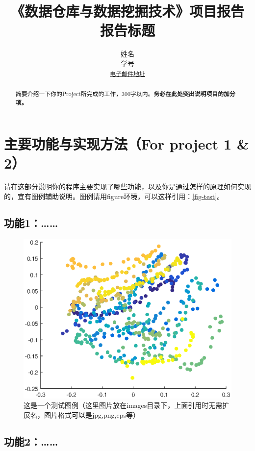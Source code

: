 \documentclass{ctexrep}
\author{姓名\\
	学号\\
	{\small \texttt{\href{mailto:电子邮件地址}{电子邮件地址}}}}
\affil{院系}
\title{《数据仓库与数据挖掘技术》项目报告\\
	报告标题}
\begin{document}
\maketitle
\tableofcontents

\begin{abstract}
	简要介绍一下你的Project所完成的工作，300字以内。\textbf{务必在此处突出说明项目的加分项。}
\end{abstract}

\chapter{主要功能与实现方法（For project 1 \& 2）}

请在这部分说明你的程序主要实现了哪些功能，以及你是通过怎样的原理如何实现的，宜有图例辅助说明。图例请用figure环境，可以这样引用：\autoref{fig-test}。

\section{功能1：……}

\begin{figure}
	\centering
	\includegraphics[width=\linewidth]{images/test}
	\caption{这是一个测试图例（这里图片放在images目录下，上面引用时无需扩展名，图片格式可以是jpg,png,eps等）}
	\label{fig-test}
\end{figure}

\section{功能2：……}
\end{document}
